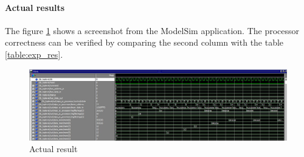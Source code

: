 \paragraph{Actual results}
The figure \ref{fig:act_res} shows a screenshot from the ModelSim application. The processor correctness can be verified by comparing the second column with the table \ref{table:exp_res}.

\begin{figure}[h]
		\centerline{\includegraphics[width=550px]{figures/toplevel_tb_result}}
		\caption{Actual result}
		\label{fig:act_res}
\end{figure}

